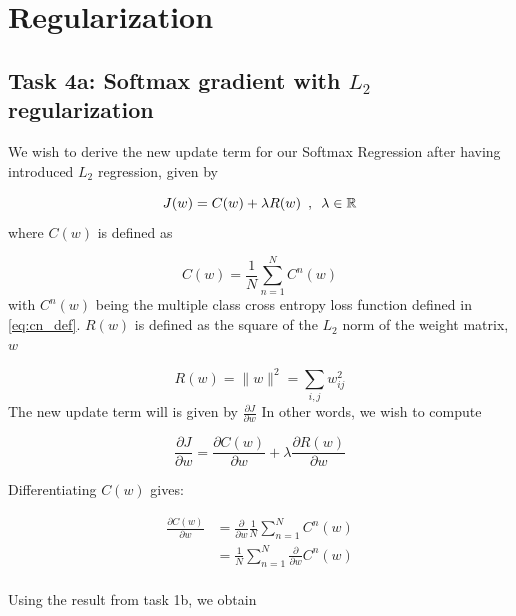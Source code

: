 \documentclass{article}
\begin{document}
\section{Regularization}

\subsection{Task 4a: Softmax gradient with $L_2$ regularization}

We wish to derive the new update term for our Softmax Regression after having introduced $L_2$ regression, given by

\begin{equation}
    J(w) = C(w) + \lambda R(w) \enskip , \enskip \lambda \in \mathbb{R}
\end{equation} 
where $C(w)$ is defined as

\begin{equation}
    C(w) = \frac{1}{N}\sum_{n=1}^N C^n(w)
\end{equation}
with $C^n(w)$ being the  multiple class cross entropy loss function defined in \eqref{eq:cn_def}. $R(w)$ is defined as the square of the $L_2$ norm of the weight matrix, $w$

\begin{equation}
    R(w) = \|w\|^2 = \sum_{i,j} w_{ij}^2
\end{equation}
The new update term will is given by $\frac{\partial J}{\partial w}$ In other words, we wish to compute

\begin{equation}
    \frac{\partial J}{\partial w} = \frac{\partial C(w)}{\partial w} + \lambda \frac{\partial R(w)}{\partial w}
    \label{eq:partial_j}
\end{equation}


Differentiating $C(w)$ gives:


\begin{align}
    \frac{\partial C(w)}{\partial w} &= \frac{\partial}{\partial w} \frac{1}{N} 
    \sum_{n=1}^N C^n(w) \\
    &= \frac{1}{N} \sum_{n=1}^N \frac{\partial}{\partial w} C^n(w) \\
\end{align}

Using the result from task 1b, we obtain
\end{document}
